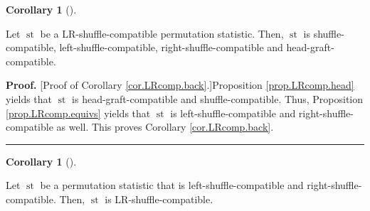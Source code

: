 \documentclass[numbers=enddot,12pt,final,onecolumn,notitlepage]{scrartcl}%
\theoremstyle{definition}
\newtheorem{coro}[theo]{Corollary}
\newenvironment{corollary}[1][]
{\begin{coro}[#1]\begin{leftbar}}
{\end{leftbar}\end{coro}}
\newenvironment{proof}[1][Proof]{\noindent\textbf{#1.} }{\ \rule{0.5em}{0.5em}}
\newenvironment{verlong}{}{}
\begin{document}
\begin{corollary}
\label{cor.LRcomp.back}Let $\operatorname*{st}$ be a LR-shuffle-compatible
permutation statistic. Then, $\operatorname*{st}$ is shuffle-compatible,
left-shuffle-compatible, right-shuffle-compatible and head-graft-compatible.
\end{corollary}

\begin{verlong}
\begin{proof}
[Proof of Corollary \ref{cor.LRcomp.back}.]Proposition \ref{prop.LRcomp.head}
yields that $\operatorname*{st}$ is head-graft-compatible and
shuffle-compatible. Thus, Proposition \ref{prop.LRcomp.equivs} yields that
$\operatorname*{st}$ is left-shuffle-compatible and right-shuffle-compatible
as well. This proves Corollary \ref{cor.LRcomp.back}.
\end{proof}
\end{verlong}

\begin{corollary}
\label{cor.LRcomp.two}Let $\operatorname*{st}$ be a permutation statistic that
is left-shuffle-compatible and right-shuffle-compatible. Then,
$\operatorname*{st}$ is LR-shuffle-compatible.
\end{corollary}
\end{document}
